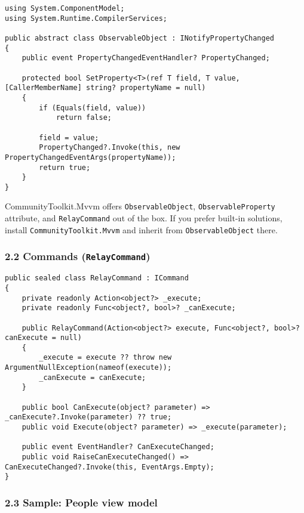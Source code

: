 \begin{lstlisting}
using System.ComponentModel;
using System.Runtime.CompilerServices;

public abstract class ObservableObject : INotifyPropertyChanged
{
    public event PropertyChangedEventHandler? PropertyChanged;

    protected bool SetProperty<T>(ref T field, T value, [CallerMemberName] string? propertyName = null)
    {
        if (Equals(field, value))
            return false;

        field = value;
        PropertyChanged?.Invoke(this, new PropertyChangedEventArgs(propertyName));
        return true;
    }
}
\end{lstlisting}

CommunityToolkit.Mvvm offers \passthrough{\lstinline!ObservableObject!},
\passthrough{\lstinline!ObservableProperty!} attribute, and
\passthrough{\lstinline!RelayCommand!} out of the box. If you prefer
built-in solutions, install
\passthrough{\lstinline!CommunityToolkit.Mvvm!} and inherit from
\passthrough{\lstinline!ObservableObject!} there.

\subsubsection{\texorpdfstring{2.2 Commands
(\texttt{RelayCommand})}{2.2 Commands (RelayCommand)}}\label{commands-relaycommand}

\begin{lstlisting}
public sealed class RelayCommand : ICommand
{
    private readonly Action<object?> _execute;
    private readonly Func<object?, bool>? _canExecute;

    public RelayCommand(Action<object?> execute, Func<object?, bool>? canExecute = null)
    {
        _execute = execute ?? throw new ArgumentNullException(nameof(execute));
        _canExecute = canExecute;
    }

    public bool CanExecute(object? parameter) => _canExecute?.Invoke(parameter) ?? true;
    public void Execute(object? parameter) => _execute(parameter);

    public event EventHandler? CanExecuteChanged;
    public void RaiseCanExecuteChanged() => CanExecuteChanged?.Invoke(this, EventArgs.Empty);
}
\end{lstlisting}

\subsubsection{2.3 Sample: People view
model}\label{sample-people-view-model}


